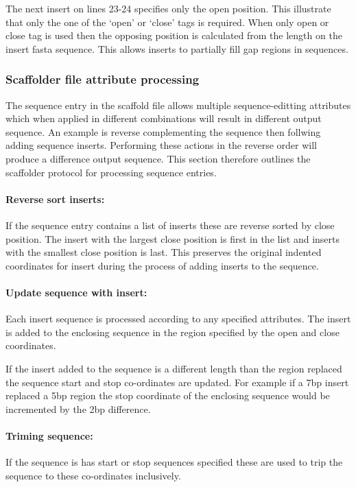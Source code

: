 \documentclass[10pt]{bmc_article}
\newenvironment{bmcformat}{\begin{raggedright}\baselineskip20pt\sloppy\setboolean{publ}{false}}{\end{raggedright}\baselineskip20pt\sloppy}
\begin{document}
\begin{bmcformat}
The next insert on lines 23-24 specifies only the open position. This
illustrate that only the one of the `open' or `close' tags is required.  When
only open or close tag is used then the opposing position is calculated from
the length on the insert fasta sequence. This allows inserts to partially fill
gap regions in sequences. \pb

\subsubsection*{Scaffolder file attribute processing} %

The sequence entry in the scaffold file allows multiple sequence-editting
attributes which when applied in different combinations will result in
different output sequence. An example is reverse complementing the sequence
then follwing adding sequence inserts. Performing these actions in the reverse
order will produce a difference output sequence. This section therefore
outlines the scaffolder protocol for processing sequence entries. \pb

\paragraph{Reverse sort inserts:} If the sequence entry contains a list of
inserts these are reverse sorted by close position. The insert with the
largest close position is first in the list and inserts with the smallest
close position is last. This preserves the original indented coordinates for
insert during the process of adding inserts to the sequence. \pb

\paragraph{Update sequence with insert:} Each insert sequence is processed
according to any specified attributes. The insert is added to the enclosing
sequence in the region specified by the open and close coordinates. \pb

If the insert added to the sequence is a different length than the region
replaced the sequence start and stop co-ordinates are updated. For example if
a 7bp insert replaced a 5bp region the stop coordinate of the enclosing
sequence would be incremented by the 2bp difference. \pb

\paragraph{Triming sequence:} If the sequence is has start or stop sequences
specified these are used to trip the sequence to these co-ordinates
inclusively. \pb 


\end{bmcformat}
\end{document}
